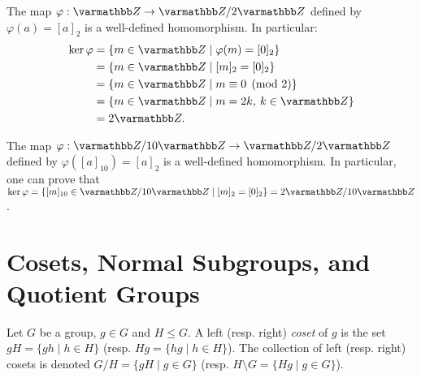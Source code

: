     \begin{example}
        The map $\varphi:\bfZ \rightarrow \bfZ/2\bfZ$ defined by $\varphi(a) = [a]_2$ is a well-defined homomorphism. In particular:
            \begin{equation*}
            \begin{split}
                \ker \varphi 
                & = \{m \in \bfZ \mid \varphi(m) = [0]_2 \} \\
                & = \{m \in \bfZ \mid [m]_2 = [0]_2 \} \\
                & = \{m \in \bfZ \mid m \equiv 0 \pmod{2}\} \\
                & = \{m \in \bfZ \mid m = 2k,\h2 k \in \bfZ\} \\
                & = 2\bfZ.
            \end{split}
            \end{equation*}
    \end{example}

    \begin{example}
        The map $\varphi:\bfZ/10\bfZ \rightarrow \bfZ/2\bfZ$ defined by $\varphi([a]_{10}) = [a]_2$ is a well-defined homomorphism. In particular, one can prove that $\ker \varphi = \{[m]_{10} \in \bfZ/10\bfZ \mid [m]_2 = [0]_2 \} = 2\bfZ/10\bfZ$.
    \end{example}

\section{Cosets, Normal Subgroups, and Quotient Groups}
    \begin{definition}
        Let $G$ be a group, $g \in G$ and $H \leq G$. A left (resp. right) \textit{coset} of $g$ is the set $gH = \{gh \mid h \in H\}$ (resp. $Hg = \{hg \mid h \in H\}$). The collection of left (resp. right) cosets is denoted $G/H = \{gH \mid g \in G\}$ (resp. $H\setminus G = \{Hg \mid g \in G\}$).
    \end{definition}



    